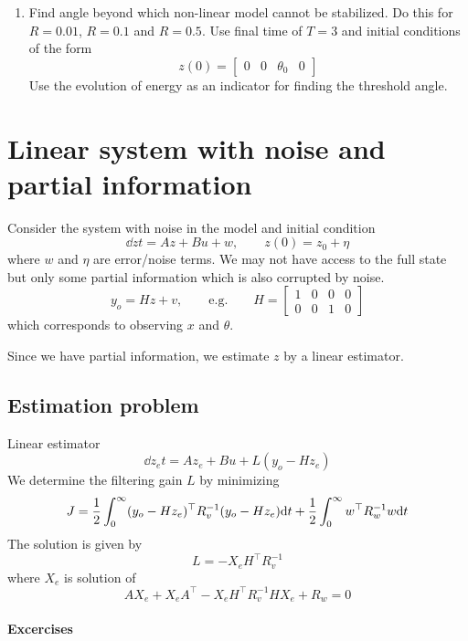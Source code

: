 \documentclass[12pt]{article}
\begin{document}
\begin{enumerate}
\item Find angle beyond which non-linear model cannot be stabilized. Do this for $R=0.01$, $R=0.1$ and $R=0.5$. Use final time of $T=3$ and initial conditions of the form 
\[
z(0) = \begin{bmatrix}
0 & 0 & \theta_0 & 0 
\end{bmatrix}
\]
Use the evolution of energy as an indicator for finding the threshold angle.

\end{enumerate}


\section{Linear system with noise and partial information}
Consider the system with noise in the model and initial condition
\[
\dd{z}{t} = Az + Bu + w, \qquad z(0) = z_0 + \eta
\]
where $w$ and $\eta$ are error/noise terms. We may not have access to the full state but only some partial information which is also corrupted by noise.
\[
y_o = Hz  + v, \qquad \textrm{e.g.} \qquad H = \begin{bmatrix}
1 & 0 & 0 & 0 \\
0 & 0 & 1 & 0 \end{bmatrix}
\]
which corresponds to observing $x$ and $\theta$.

\vspace{5mm}

Since we have partial information, we estimate $z$ by a linear estimator.

\subsection{Estimation problem}
Linear estimator
\[
\dd{z_e}{t} = A z_e + Bu + L(y_o - H z_e)
\]
We determine the filtering gain $L$ by minimizing
\[
J = \frac{1}{2} \int_0^\infty (y_o - H z_e)^\top R_v^{-1} (y_o - H z_e) \textrm{d} t +            \frac{1}{2} \int_0^\infty w^\top R_w^{-1} w \textrm{d} t
\]
The solution is given by
\[
L = - X_e H^\top R_v^{-1}
\]
where $X_e$ is solution of
\[
A X_e + X_e A^\top - X_e H^\top R_v^{-1}  H X_e + R_w = 0
\]

\paragraph{Excercises}
\end{document}
